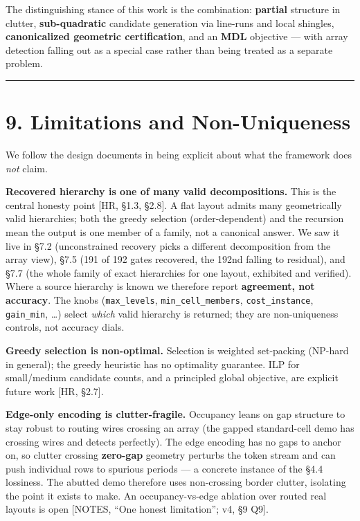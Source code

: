 \documentclass[
  11pt,
]{article}
\begin{document}
The distinguishing stance of this work is the combination:
\textbf{partial} structure in clutter, \textbf{sub-quadratic} candidate
generation via line-runs and local shingles, \textbf{canonicalized
geometric certification}, and an \textbf{MDL} objective --- with array
detection falling out as a special case rather than being treated as a
separate problem.

\begin{center}\rule{0.5\linewidth}{0.5pt}\end{center}

\section{9. Limitations and
Non-Uniqueness}\label{limitations-and-non-uniqueness}

We follow the design documents in being explicit about what the
framework does \emph{not} claim.

\textbf{Recovered hierarchy is one of many valid decompositions.} This
is the central honesty point {[}HR, §1.3, §2.8{]}. A flat layout admits
many geometrically valid hierarchies; both the greedy selection
(order-dependent) and the recursion mean the output is one member of a
family, not a canonical answer. We saw it live in §7.2 (unconstrained
recovery picks a different decomposition from the array view), §7.5 (191
of 192 gates recovered, the 192nd falling to residual), and §7.7 (the
whole family of exact hierarchies for one layout, exhibited and
verified). Where a source hierarchy is known we therefore report
\textbf{agreement, not accuracy}. The knobs (\texttt{max\_levels},
\texttt{min\_cell\_members}, \texttt{cost\_instance},
\texttt{gain\_min}, \ldots) select \emph{which} valid hierarchy is
returned; they are non-uniqueness controls, not accuracy dials.

\textbf{Greedy selection is non-optimal.} Selection is weighted
set-packing (NP-hard in general); the greedy heuristic has no optimality
guarantee. ILP for small/medium candidate counts, and a principled
global objective, are explicit future work {[}HR, §2.7{]}.

\textbf{Edge-only encoding is clutter-fragile.} Occupancy leans on gap
structure to stay robust to routing wires crossing an array (the gapped
standard-cell demo has crossing wires and detects perfectly). The edge
encoding has no gaps to anchor on, so clutter crossing \textbf{zero-gap}
geometry perturbs the token stream and can push individual rows to
spurious periods --- a concrete instance of the §4.4 lossiness. The
abutted demo therefore uses non-crossing border clutter, isolating the
point it exists to make. An occupancy-vs-edge ablation over routed real
layouts is open {[}NOTES, ``One honest limitation''; v4, §9 Q9{]}.
\end{document}
